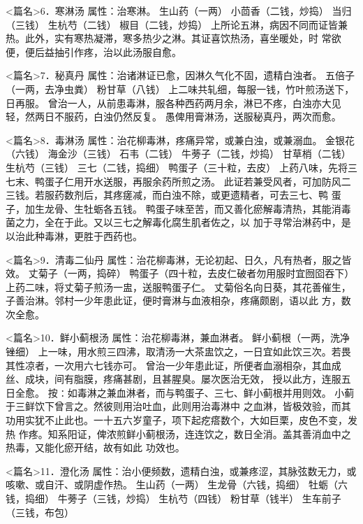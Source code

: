 \documentclass[a4paper,12pt,UTF8,twoside]{ctexbook}
\begin{document}
<篇名>6．寒淋汤
属性：治寒淋。 
生山药（一两） 小茴香（二钱，炒捣） 当归（三钱） 生杭芍（二钱） 椒目（二钱，炒捣） 
上所论五淋，病因不同而证皆兼热。此外，实有寒热凝滞，寒多热少之淋。其证喜饮热汤，喜坐暖处，时 
常欲便，便后益抽引作疼，治以此汤服自愈。 


<篇名>7．秘真丹
属性：治诸淋证已愈，因淋久气化不固，遗精白浊者。 
五倍子（一两，去净虫粪） 粉甘草（八钱） 
上二味共轧细，每服一钱，竹叶煎汤送下，日再服。 
曾治一人，从前患毒淋，服各种西药两月余，淋已不疼，白浊亦大见轻，然两日不服药，白浊仍然反复。 
愚俾用膏淋汤，送服秘真丹，两次而愈。 


<篇名>8．毒淋汤
属性：治花柳毒淋，疼痛异常，或兼白浊，或兼溺血。 
金银花（六钱） 海金沙（三钱） 石韦（二钱） 牛蒡子（二钱，炒捣） 甘草梢（二钱） 生杭芍（三钱） 
三七（二钱，捣细） 鸭蛋子（三十粒，去皮） 
上药八味，先将三七末、鸭蛋子仁用开水送服，再服余药所煎之汤。 
此证若兼受风者，可加防风二三钱。若服药数剂后，其疼瘥减，而白浊不除，或更遗精者，可去三七、鸭 
蛋子，加生龙骨、生牡蛎各五钱。 
鸭蛋子味至苦，而又善化瘀解毒清热，其能消毒菌之力，全在于此。又以三七之解毒化腐生肌者佐之，以 
加于寻常治淋药中，是以治此种毒淋，更胜于西药也。 


<篇名>9．清毒二仙丹
属性：治花柳毒淋，无论初起、日久，凡有热者，服之皆效。 
丈菊子（一两，捣碎） 鸭蛋子（四十粒，去皮仁破者勿用服时宜囫囵吞下） 
上药二味，将丈菊子煎汤一盅，送服鸭蛋子仁。 
丈菊俗名向日葵，其花善催生，子善治淋。邻村一少年患此证，便时膏淋与血液相杂，疼痛颇剧，语以此 
方，数次全愈。 


<篇名>10．鲜小蓟根汤
属性：治花柳毒淋，兼血淋者。 
鲜小蓟根（一两，洗净锉细） 
上一味，用水煎三四沸，取清汤一大茶盅饮之，一日宜如此饮三次。若畏其性凉者，一次用六七钱亦可。 
曾治一少年患此证，所便者血溺相杂，其血成丝、成块，间有脂膜，疼痛甚剧，且甚腥臭。屡次医治无效， 
授以此方，连服五日全愈。 
按∶如毒淋之兼血淋者，而与鸭蛋子、三七、鲜小蓟根并用则效。 
小蓟于三鲜饮下曾言之。然彼则用治吐血，此则用治毒淋中 
之血淋，皆极效验，而其功用实犹不止此也。一十五六岁童子，项下起疙瘩数个，大如巨栗，皮色不变，发热 
作疼。知系阳证，俾浓煎鲜小蓟根汤，连连饮之，数日全消。盖其善消血中之热毒，又能化瘀开结，故有如此 
功效也。 


<篇名>11．澄化汤
属性：治小便频数，遗精白浊，或兼疼涩，其脉弦数无力，或咳嗽、或自汗、或阴虚作热。 
生山药（一两） 生龙骨（六钱，捣细） 牡蛎（六钱，捣细） 牛蒡子（三钱，炒捣） 生杭芍（四钱） 
粉甘草（钱半） 生车前子（三钱，布包） 
\end{document}
